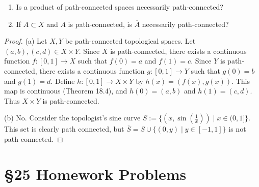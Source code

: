 \documentclass[10pt,oneside,openany]{memoir}
\begin{document}
\begin{exercise}[manual-num={8}]
    \phantom{a}
    \begin{enumerate}[label = (\alph*),itemsep=1pt,topsep=3pt]
        \item Is a product of path-connected spaces necessarily path-connected?
        \item If $A \subset X$ and $A$ is path-connected, is $\overline{A}$ necessarily path-connected?
    \end{enumerate}
\end{exercise}
    \begin{proof}
        (a) Let $X,Y$ be path-connected topological spaces. Let $(a,b),(c,d) \in X \times Y$. Since $X$ is path-connected, there exists a continuous function $f:[0,1] \rightarrow X$ such that $f(0) = a$ and $f(1) = c$. Since $Y$ is path-connected, there exists a continuous function $g:[0,1] \rightarrow Y$ such that $g(0) = b$ and $g(1) = d$. Define $h:[0,1] \rightarrow X \times Y$ by $h(x) = (f(x),g(x))$. This map is continuous (Theorem 18.4), and $h(0) = (a,b)$ and $h(1) = (c,d)$. Thus $X \times Y$ is path-connected.

        (b) No. Consider the topologist's sine curve $S := \{(x, \sin(\frac{1}{x})) \mid x \in (0,1]\}$. This set is clearly path connected, but $\overline{S} = S \cup \{(0,y) \mid y \in [-1,1]\}$ is not path-connected.
    \end{proof}
\section*{\S 25 Homework Problems}
\end{document}
